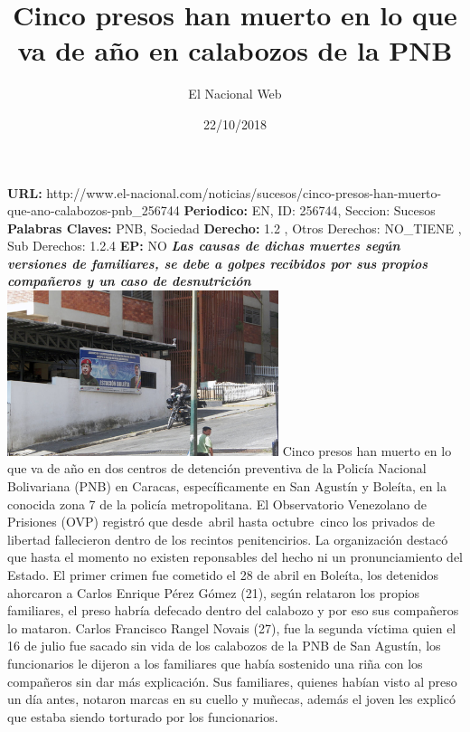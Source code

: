 \documentclass{article}%
\title{\textbf{Cinco presos han muerto en lo que va de año en calabozos de la PNB}}%
\author{El Nacional Web}%
\date{22/10/2018}%
\begin{document}
%
\normalsize%
\maketitle%
\textbf{URL: }%
http://www.el{-}nacional.com/noticias/sucesos/cinco{-}presos{-}han{-}muerto{-}que{-}ano{-}calabozos{-}pnb\_256744\newline%
%
\textbf{Periodico: }%
EN, %
ID: %
256744, %
Seccion: %
Sucesos\newline%
%
\textbf{Palabras Claves: }%
PNB, Sociedad\newline%
%
\textbf{Derecho: }%
1.2%
, Otros Derechos: %
NO\_TIENE%
, Sub Derechos: %
1.2.4%
\newline%
%
\textbf{EP: }%
NO\newline%
\newline%
%
\textbf{\textit{Las causas de dichas muertes según versiones de familiares, se debe a golpes recibidos por sus propios compañeros y un caso de desnutrición~}}%
\newline%
\newline%
%
\includegraphics[width=300px]{125.jpg}%
\newline%
%
Cinco presos han muerto en lo que va de año en dos centros de detención preventiva de la Policía Nacional Bolivariana (PNB) en Caracas, específicamente en San Agustín y Boleíta, en la conocida zona 7 de la policía metropolitana.%
\newline%
%
El Observatorio Venezolano de Prisiones (OVP) registró que desde~abril hasta octubre~cinco los privados de libertad fallecieron dentro de los recintos penitencirios. La organización destacó que hasta el momento no existen reponsables del hecho ni un pronunciamiento del Estado.%
\newline%
%
El primer crimen fue cometido el 28 de abril en Boleíta, los detenidos ahorcaron a Carlos Enrique Pérez Gómez (21), según relataron los propios familiares, el preso habría defecado dentro del calabozo y por eso sus compañeros lo mataron.%
\newline%
%
Carlos Francisco Rangel Novais (27), fue la segunda víctima quien el 16 de julio fue sacado sin vida de los calabozos de la PNB de San Agustín, los funcionarios le dijeron a los familiares que había sostenido una riña con los compañeros sin dar más explicación. Sus familiares, quienes habían visto al preso un día antes, notaron marcas en su cuello y muñecas, además el joven les explicó que estaba siendo torturado por los funcionarios.%
\end{document}

